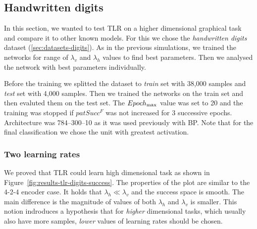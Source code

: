 

\subsection{Handwritten digits} 
\label{sec:results-digits} 

In this section, we wanted to test TLR on a higher dimensional graphical task and compare it to other known models. For this we chose the \emph{handwritten digits} dataset (\ref{sec:datasets-digits}). As in the previous simulations, we trained the networks for range of $\lambda_v$ and $\lambda_h$ values to find best parameters. Then we analysed the network with best parameters individually. 

Before the training we splitted the dataset to \emph{train} set with 38,000 samples and \emph{test} set with 4,000 samples. Then we trained the networks on the train set and then evaluted them on the test set. The $Epoch_{\rm max}$ value was set to 20 and the training was stopped if $patSucc^F$ was not increased for 3 successive epochs. Architecture was 784--300--10 as it was used previously with BP. Note that for the final classification we chose the unit with greatest activation. 

\subsubsection{Two learning rates} 
\label{sec:tlr-digits} 

We proved that TLR could learn high dimensional task as shown in Figure~\ref{fig:results-tlr-digits-success}. The properties of the plot are similar to the 4-2-4 encoder case. It holds that $\lambda_h \ll \lambda_v$ and the success space is smooth. The main difference is the magnitude of values of both $\lambda_h$ and $\lambda_v$ is smaller. This notion indroduces a hypothesis that for \emph{higher} dimensional tasks, which usually also have more samples, \emph{lower} values of learning rates should be chosen. 

